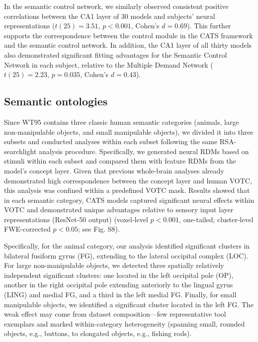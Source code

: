 \documentclass[pdflatex,sn-mathphys-num,lineno]{sn-jnl}%
\begin{document}
\begin{CJK}{UTF8}{gbsn}
In the semantic control network, we similarly observed consistent positive correlations between the CA1 layer of 30 models and subjects' neural representations ($t(25) = 3.51$, $p < 0.001$, Cohen’s $d = 0.69$). This further supports the correspondence between the control module in the CATS framework and the semantic control network. In addition, the CA1 layer of all thirty models also demonstrated significant fitting advantages for the Semantic Control Network in each subject, relative to the Multiple Demand Network ($t(25) = 2.23$, $p = 0.035$, Cohen’s $d = 0.43$).

\subsection{Semantic ontologies}
Since WT95 contains three classic human semantic categories (animals, large non-manipulable objects, and small manipulable objects), we divided it into three subsets and conducted analyses within each subset following the same RSA-searchlight analysis procedure. Specifically, we generated neural RDMs based on stimuli within each subset and compared them with feature RDMs from the model's concept layer. Given that previous whole-brain analyses already demonstrated high correspondence between the concept layer and human VOTC, this analysis was confined within a predefined VOTC mask. Results showed that in each semantic category, CATS models captured significant neural effects within VOTC and demonstrated unique advantages relative to sensory input layer representations (ResNet-50 output) (voxel-level $p < 0.001$, one-tailed; cluster-level FWE-corrected $p < 0.05$; see Fig. S8). 

Specifically, for the animal category, our analysis identified significant clusters in bilateral fusiform gyrus (FG), extending to the lateral occipital complex (LOC). For large non-manipulable objects, we detected three spatially relatively independent significant clusters: one located in the left occipital pole (OP), another in the right occipital pole extending anteriorly to the lingual gyrus (LING) and medial FG, and a third in the left medial FG. Finally, for small manipulable objects, we identified a significant cluster located in the left FG. The weak effect may come from dataset composition—few representative tool exemplars and marked within-category heterogeneity (spanning small, rounded objects, e.g., buttons, to elongated objects, e.g., fishing rods).



\end{CJK}
\end{document}

